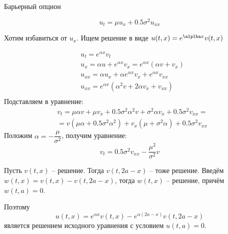 \documentclass[12pt]{article}
\begin{document}
Барьерный опцион

$$
    u_t = \mu u_x + 0.5 \sigma^2 u_{xx}
$$

Хотим избавиться от $u_x$. Ищем решение в виде $u(t, x) = e^{\alplha x} v(t, x)$

\begin{align*}
    &u_t = e^{\alpha x} v_t\\
    &u_x = \alpha u + e^{\alpha x} v_x = e^{\alpha x}( \alpha v + v_x)\\
    &u_{xx} = \alpha u_x + \alpha e^{\alpha x} v_x + e^{\alpha x} v_{xx}\\
    &u_{xx} = e^{\alpha x} \left( \alpha^2 v + 2 \alpha v_x + v_{xx}\right)\\
\end{align*}
Подставляем в уравнение:
\begin{align*}
    &v_t = \mu \alpha v + \mu v_x + 0.5 \sigma^2 \alpha^2 v + \sigma^2 \alpha v_x + 0.5 \sigma^2 v_{xx} =\\
    &= v (\mu \alpha + 0.5 \sigma^2 \alpha^2) + v_x (\mu + \sigma^2 \alpha )
    + 0.5 \sigma^2 v_{xx}
\end{align*}Положим $\alpha = -\dfrac{\mu}{\sigma^2}$, получим уравнение:
$$
    v_t = 0.5 \sigma^2 v_{xx} - \dfrac{\mu^2}{\sigma^2} v
$$

Пусть $v(t, x)$ -- решение. Тогда $v(t, 2a - x)$ -- тоже решение.  Введём
$w(t, x) = v(t, x) - v(t, 2a - x)$, тогда $w(t, x)$ -- решение, причём $w(t, a) = 0$.

Поэтому 
$$
    u(t, x) = e^{\alpha x} v(t, x) - e^{\alpha (2a - x)} v(t, 2a - x)
$$является решением исходного уравнения с условием $u(t, a) = 0$.
\end{document}
